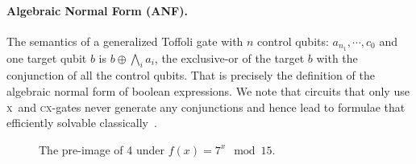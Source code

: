 \documentclass{article}
\newcommand{\x}{\textsc{x}}
\newcommand{\cx}{\textsc{cx}}
\begin{document}
\begin{refsection}
\paragraph*{Algebraic Normal Form (ANF).}
The semantics of a generalized Toffoli gate with $n$ control qubits:
$a_{n_1},\cdots,c_0$ and one target qubit $b$ is $b \oplus \bigwedge_i
a_i$, the exclusive-or of the target $b$ with the conjunction of all
the control qubits. That is precisely the definition of the algebraic
normal form of boolean expressions. We note that circuits that only
use \x\ and \cx-gates never generate any conjunctions and hence lead
to formulae that efficiently solvable
classically~\cite{10.5555/35517,TOKAREVA20151}.

\begin{wrapfigure}{r}{7cm}
\begin{center}
\end{center}
\caption{\label{fig:preimage}The pre-image of 4 under $f(x) = 7^x \mod 15$.}
\end{wrapfigure}

\end{refsection}
\end{document}
